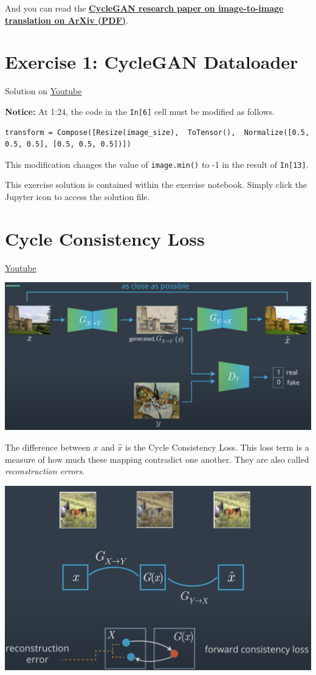 And you can read the \href{https://arxiv.org/pdf/1703.10593.pdf}{\textbf{CycleGAN research paper on image-to-image translation on ArXiv (PDF)}}.

\section{Exercise 1: CycleGAN Dataloader}

Solution on \href{https://www.youtube.com/watch?v=GktDibcEs64&t=3s}{Youtube}

\textbf{Notice:} At 1:24, the code in the \verb|In[6]| cell must be modified as follows.
\begin{lstlisting}
transform = Compose([Resize(image_size),  ToTensor(),  Normalize([0.5, 0.5, 0.5], [0.5, 0.5, 0.5])])
\end{lstlisting}
This modification changes the value of \lstinline|image.min()| to -1 in the result of \lstinline|In[13]|. \newline

This exercise solution is contained within the exercise notebook. Simply click the Jupyter icon to access the solution file.
\section{Cycle Consistency Loss}
\href{https://www.youtube.com/watch?v=pPbWXmVgY0k&t=1s}{Youtube}

\includegraphics[width=1\linewidth]{img//genAdvNet//image2image/forwardCycleConsistencyLoss.png}

The difference between \(x\) and \(\hat{x}\) is the Cycle Consistency Loss. This loss term is a measure of how much these mapping contradict one another. They are also called \textit{reconstruction errors}.

\includegraphics[width=1\linewidth]{img//genAdvNet//image2image/reconstructionError.png}

